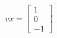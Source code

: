 \documentclass[preview]{standalone}
\begin{document}
\begin{align*}
vx=\begin{bmatrix}
                        1\\
                        0\\
                        -1
                        \end{bmatrix}\\
\end{align*}
\end{document}

